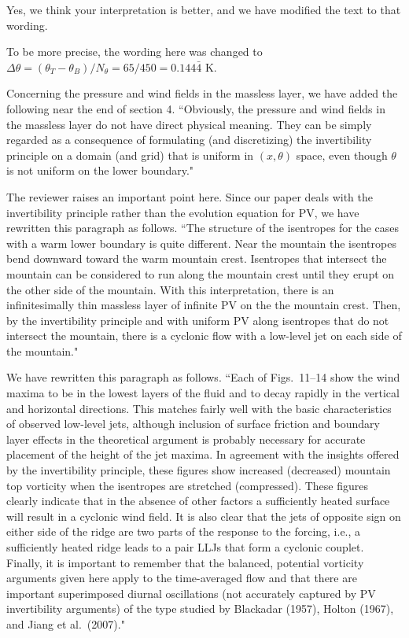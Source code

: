 \documentclass[11pt]{article}
\begin{document}
\medskip
{}  Yes, we think your interpretation is better, and we 
have modified the text to that wording. 

\medskip
{}  To be more precise, the wording here was changed to 
$\Delta\theta=(\theta_T-\theta_B)/N_\theta=65/450=0.144\bar{4}$ K.   

\medskip
{}  Concerning the pressure and wind fields in 
the massless layer, we have added the following near the end of section 4. 
``Obviously, the pressure and wind fields in the massless layer do 
not have direct physical meaning. They can be simply regarded as 
a consequence of formulating (and discretizing) the invertibility 
principle on a domain (and grid) that is uniform in $(x,\theta)$ space, 
even though $\theta$ is not uniform on the lower boundary."  


\medskip
{} The reviewer raises an important point here. 
Since our paper deals with the invertibility principle rather than the evolution equation 
for PV, we have rewritten this paragraph as follows. 
``The structure of the isentropes for the cases with a warm lower boundary is quite different.  
Near the mountain the isentropes bend downward toward the warm mountain crest. Isentropes that 
intersect the mountain can be considered to run along the mountain crest until they erupt on 
the other side of the mountain. With this interpretation, there is an infinitesimally thin
massless layer of infinite PV on the the mountain crest. Then, by the invertibility principle 
and with uniform PV along isentropes that do not intersect the mountain, there is a cyclonic 
flow with a low-level jet on each side of the mountain." 

\medskip
{}   We have rewritten this paragraph as follows. 
``Each of Figs.~11--14 show the wind maxima to be in the lowest layers of 
the fluid and to decay rapidly in the vertical and horizontal directions.  
This matches fairly well with the basic characteristics of observed low-level jets, 
although inclusion of surface friction and boundary layer effects in the theoretical argument 
is probably necessary for accurate placement of the height of the jet maxima. 
In agreement with the insights offered by the invertibility principle, these 
figures show increased (decreased) mountain top vorticity when the isentropes 
are stretched (compressed). These figures clearly indicate that in the absence 
of other factors a sufficiently heated surface will result in a cyclonic wind field.
It is also clear that the jets of opposite sign on either side of the ridge are 
two parts of the response to the forcing, i.e., a sufficiently heated ridge leads  
to a pair LLJs that form a cyclonic couplet. Finally, it is important to remember that 
the balanced, potential vorticity arguments given here apply to the time-averaged 
flow and that there are important superimposed diurnal oscillations (not accurately 
captured by PV invertibility arguments) of the 
type studied by Blackadar (1957), Holton (1967), and Jiang et al.~(2007)."       
\end{document}
